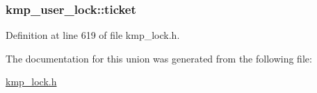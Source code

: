 \hypertarget{unionkmp__user__lock_a92265fa873dccf540063d31fd19030ae}{
\subsubsection[{ticket}]{ kmp\-\_\-user\-\_\-lock\-::ticket}}\label{unionkmp__user__lock_a92265fa873dccf540063d31fd19030ae}


Definition at line 619 of file kmp\-\_\-lock.\-h.



The documentation for this union was generated from the following file\-:\begin{DoxyCompactItemize}
\item 
\hyperlink{kmp__lock_8h}{kmp\-\_\-lock.\-h}\end{DoxyCompactItemize}
